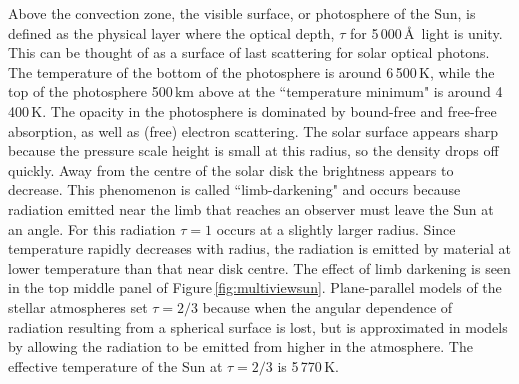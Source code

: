 Above the convection zone, the visible surface, or photosphere of the Sun, is defined as the physical layer where the optical depth, $\tau$ for 5\,000\,\AA\ light is unity. This can be thought of as a surface of last scattering for solar optical photons. The temperature of the bottom of the photosphere is around 6\,500\,K, while the top of the photosphere 500\,km above at the ``temperature minimum" is around 4\,400\,K. The opacity in the photosphere is dominated by bound-free and free-free absorption, as well as (free) electron scattering. The solar surface appears sharp because the pressure scale height is small at this radius, so the density drops off quickly. Away from the centre of the solar disk the brightness appears to decrease. This phenomenon is called ``limb-darkening" and occurs because radiation emitted near the limb that reaches an observer must leave the Sun at an angle. For this radiation $\tau=1$ occurs at a slightly larger radius. Since temperature rapidly decreases with radius, the radiation is emitted by material at lower temperature than that near disk centre. The effect of limb darkening is seen in the top middle panel of Figure\,\ref{fig:multiviewsun}. Plane-parallel models of the stellar atmospheres set $\tau=2/3$ because when the angular dependence of radiation resulting from a spherical surface is lost, but is approximated in models by allowing the radiation to be emitted from higher in the atmosphere. The effective temperature of the Sun at $\tau=2/3$ is 5\,770\,K. %


